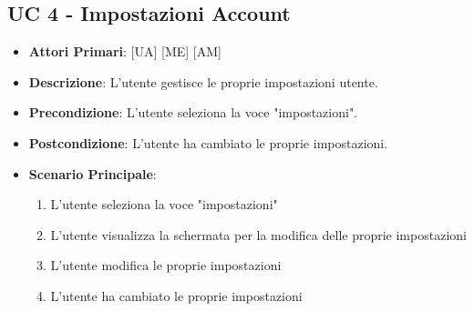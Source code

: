	\subsection{UC 4 - Impostazioni Account}
		
		
		\begin{itemize}
			\item \textbf{Attori Primari}: [UA] [ME] [AM]
			\item \textbf{Descrizione}: L'utente gestisce le proprie impostazioni utente.
			\item \textbf{Precondizione}: L'utente seleziona la voce "impostazioni".
			\item \textbf{Postcondizione}: L'utente ha cambiato le proprie impostazioni.
			\item \textbf{Scenario Principale}:
			\begin{enumerate}
				\item{L'utente seleziona la voce "impostazioni"}
				\item{L'utente visualizza la schermata per la modifica delle proprie impostazioni}
				\item{L'utente modifica le proprie impostazioni}
				\item{L'utente ha cambiato le proprie impostazioni}
			\end{enumerate}	
		\end{itemize}
			


